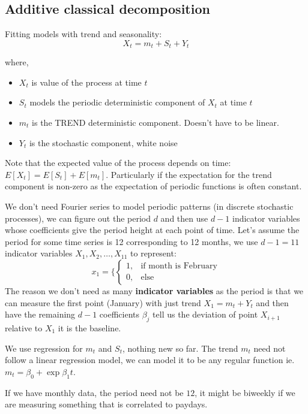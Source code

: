 \documentclass{article}
\begin{document}
\subsection{Additive classical decomposition}
Fitting models with trend and seasonality:
\[ X_t = m_t +S_t +Y_t \]

where,
\begin{itemize}
\item $X_t$ is value of the process at time $t$
\item $S_t$ models the periodic deterministic component of $X_t$ at time $t$
\item $m_t$ is the TREND deterministic component. Doesn't have to be linear.
\item $Y_t$ is the stochastic component, white noise 
\end{itemize}


Note that the expected value of the process depends on time: $E[X_t] = E[S_t] + E[m_t]$. Particularly if the expectation for the trend component is non-zero as the expectation of periodic functions is often constant.

We don't need Fourier series to model periodic patterns (in discrete stochastic processes), we can figure out the period $d$ and then use $d-1$ indicator variables whose coefficients give the period height at each point of time. Let's assume the period for some time series is 12 corresponding to 12 months, we use $d-1=11$ indicator variables $X_1, X_2, \dots, X_11$ to represent:
\begin{equation}
x_1 = 
\{
    \begin{cases}
        1, & \text{if month is February}\\
        0, & \text{else}
    \end{cases}
\end{equation}
The reason we don't need as many \textbf{indicator variables} as the period is that we can measure the first point (January) with just trend $X_1 = m_t+Y_t$ and then have the remaining $d-1$ coefficients $\beta_j$ tell us the deviation of point $X_{i+1}$ relative to $X_1$ it is the baseline. 


We use regression for $m_t$ and $S_t$, nothing new so far. The trend $m_t$ need not follow a linear regression model, we can model it to be any regular function ie. $m_t = \beta_0 + \exp{\beta_1t}$.

If we have monthly data, the period need not be $12$, it might be biweekly if we are measuring something that is correlated to paydays. 
\end{document}
